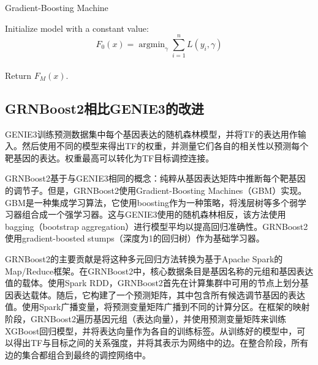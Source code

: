 \begin{algorithm}[H]
  \caption{Gradient-Boosting Machine}
  \SetAlgoLined
  Initialize model with a constant value: $$F_{0}(x) = \mathop{\arg\min}_{\gamma}\sum^{n}_{i=1}L(y_{i},\gamma)$$\\
  Return $F_{M}(x)$.\\
  \label{alg:gbm}
\end{algorithm}

\subsection{GRNBoost2相比GENIE3的改进}
  GENIE3\cite{huynh2010inferring}训练预测数据集中每个基因表达的随机森林模型，并将TF的表达用作输入。然后使用不同的模型来得出TF的权重，并测量它们各自的相关性以预测每个靶基因的表达。权重最高可以转化为TF目标调控连接。

  GRNBoost2基于与GENIE3相同的概念：纯粹从基因表达矩阵中推断每个靶基因的调节子。但是，GRNBoost2使用Gradient-Boosting Machines（GBM）\cite{friedman2001greedy}实现。GBM是一种集成学习算法，它使用boosting\cite{freund1999short}作为一种策略，将浅层树等多个弱学习器组合成一个强学习器。这与GENIE3使用的随机森林相反，该方法使用bagging（bootstrap aggregation）进行模型平均以提高回归准确性。GRNBoost2使用gradient-boosted stumps（深度为1的回归树）\cite{slawek2013ennet}作为基础学习器。

  GRNBoost2的主要贡献是将这种多元回归方法转换为基于Apache Spark\cite{zaharia2012fast}的Map/Reduce\cite{dean2008mapreduce}框架。在GRNBoost2中，核心数据条目是基因名称的元组和基因表达值的载体。使用Spark RDD，GRNBoost2首先在计算集群中可用的节点上划分基因表达载体。随后，它构建了一个预测矩阵，其中包含所有候选调节基因的表达值。使用Spark广播变量，将预测变量矩阵广播到不同的计算分区。在框架的映射阶段，GRNBoost2遍历基因元组（表达向量），并使用预测变量矩阵来训练XGBoost回归模型，并将表达向量作为各自的训练标签。从训练好的模型中，可以得出TF与目标之间的关系强度，并将其表示为网络中的边。在整合阶段，所有边的集合都组合到最终的调控网络中。

